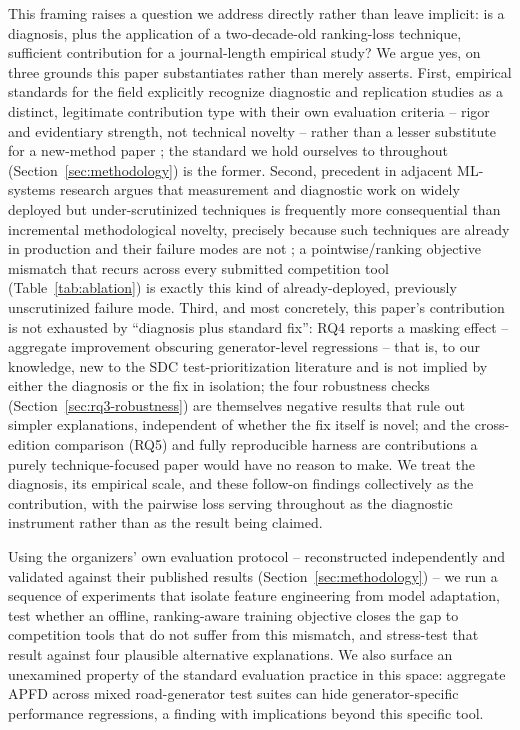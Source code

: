 \documentclass[smallextended]{svjour3}
\begin{document}
This framing raises a question we address directly rather than leave
implicit: is a diagnosis, plus the application of a two-decade-old
ranking-loss technique, sufficient contribution for a journal-length
empirical study? We argue yes, on three grounds this paper substantiates
rather than merely asserts. First, empirical standards for the field
explicitly recognize diagnostic and replication studies as a distinct,
legitimate contribution type with their own evaluation criteria -- rigor
and evidentiary strength, not technical novelty -- rather than a lesser
substitute for a new-method paper \citep{ralph2020empirical}; the
standard we hold ourselves to throughout (Section~\ref{sec:methodology})
is the former. Second, precedent in adjacent ML-systems research argues
that measurement and diagnostic work on widely deployed but
under-scrutinized techniques is frequently more consequential than
incremental methodological novelty, precisely because such techniques are
already in production and their failure modes are not
\citep{sculley2015hidden}; a pointwise/ranking objective mismatch that
recurs across every submitted competition tool (Table~\ref{tab:ablation})
is exactly this kind of already-deployed, previously unscrutinized
failure mode. Third, and most concretely, this paper's contribution is
not exhausted by ``diagnosis plus standard fix'': RQ4 reports a masking
effect -- aggregate improvement obscuring generator-level regressions --
that is, to our knowledge, new to the SDC test-prioritization literature
and is not implied by either the diagnosis or the fix in isolation; the
four robustness checks (Section~\ref{sec:rq3-robustness}) are themselves
negative results that rule out simpler explanations, independent of
whether the fix itself is novel; and the cross-edition comparison (RQ5)
and fully reproducible harness are contributions a purely
technique-focused paper would have no reason to make. We treat the
diagnosis, its empirical scale, and these follow-on findings collectively
as the contribution, with the pairwise loss serving throughout as the
diagnostic instrument rather than as the result being claimed.

Using the
organizers' own evaluation protocol -- reconstructed
independently and validated against their published results
(Section~\ref{sec:methodology}) -- we run a sequence of experiments that
isolate feature engineering from model adaptation, test whether an
offline, ranking-aware training objective closes the gap to competition
tools that do not suffer from this mismatch, and stress-test that result
against four plausible alternative explanations. We also surface an
unexamined property of the standard evaluation practice in this space:
aggregate APFD across mixed road-generator test suites can hide
generator-specific performance regressions, a finding with implications
beyond this specific tool.
\end{document}
